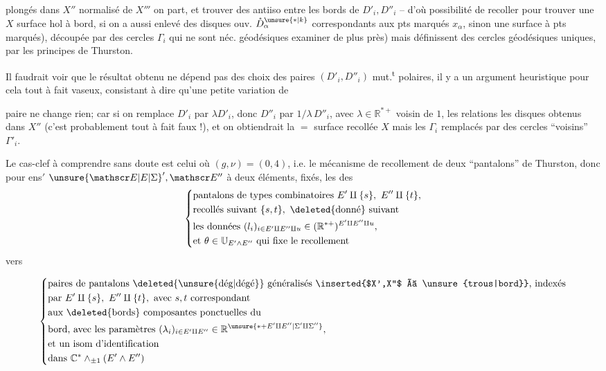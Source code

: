 plongés dans $X''$ normalisé de $X'''$   on part, et  trouver des antiiso entre les bords  de $D'_i,D''_i$ -- d'où possibilité de recoller pour trouver une $X$ surface hol à bord, si on a aussi enlevé des disques ouv. $\mathring D_{\alpha}^{\unsure{*|k}}$ correspondants aux pts marqués $x_{\alpha}$, sinon une surface à pts marqués), découpée par des cercles $\Gamma_i$ qui ne sont   néc. géodésiques   examiner de plus près) mais définissent des cercles géodésiques uniques, par les principes de Thurston.

Il faudrait voir que le résultat obtenu ne dépend pas des choix des paires $(D'_i,D''_i)$ mut.\textsuperscript{t} polaires, il y a un argument heuristique pour cela tout à fait vaseux, consistant à dire qu'une petite variation de 

paire ne change rien; car si on remplace $D'_i$ par $\lambda D'_i$, donc $D''_i$ par $1/\lambda\,D''_i$, avec $\lambda\in\mathbb R^{*+}$ voisin de $1$, les  relations   les disques obtenus dans  $X''$ (c'est probablement tout à fait faux !), et on obtiendrait la $=$ surface recollée $X$ mais les $\Gamma_i$ remplacés par des cercles ``voisins'' $\Gamma'_i$.

Le cas-clef à comprendre sans doute est celui où $(g,\nu)=(0,4)$, i.e. le mécanisme de recollement de deux ``pantalons'' de Thurston, donc pour   ens$'$ $\unsure{\mathscr E|E|\Sigma}',\mathscr E''$ à deux éléments, fixés, les  des
\[
\left\{\begin{aligned}
&\text{pantalons de types combinatoires } E'\amalg\{s\},\ E''\amalg\{t\},\\
&\text{recollés suivant } \{s,t\},\ \text{\deleted{donné} suivant}\\
&\text{les données }(l_i)_{i\in E'\amalg E''\amalg u}\in(\mathbb R^{*+})^{E'\amalg E''\amalg u},\\
&\text{et }\theta\in\mathbb U_{E'\wedge E''}\text{ qui fixe le recollement}
\end{aligned}\right.
\]
vers

\[
\left\{\begin{aligned}
&\text{paires de pantalons \deleted{\unsure{dég|dégé}} généralisés \inserted{$X',X''$ à \unsure{trous|bord}}, indexés}\\
&\text{par }E'\amalg\{s\},\ E''\amalg\{t\},\ \text{avec }s,t\text{ correspondant}\\
&\text{aux \deleted{bords} composantes ponctuelles du}\\
&\text{bord, avec les paramètres }(\lambda_i)_{i\in E'\amalg E''}\in\mathbb R^{\unsure{*+E'\amalg E''|\Sigma'\amalg\Sigma''}},\\
&\text{et un isom d'identification}\\
&\text{dans }\mathbb C^*\wedge_{\pm1}(E'\wedge E'')
\end{aligned}\right.
\]

